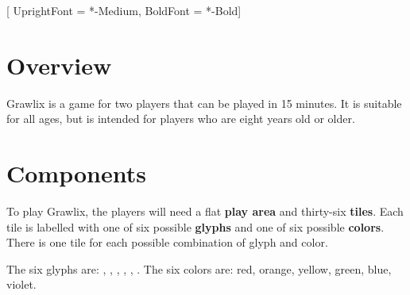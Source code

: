 \setmainfont{Quicksand}[
	UprightFont = *-Medium,
	BoldFont = *-Bold]
\raggedright

\section*{Overview}
Grawlix is a game for two players that can be played in 15  minutes. It is suitable for all ages, but is intended for players who are eight years old or older.



\section*{Components}
To play Grawlix, the players will need a flat \textbf{play area} and thirty-six \textbf{tiles}. Each tile is labelled with one of six possible \textbf{glyphs} and one of six possible \textbf{colors}.  There is one tile for each possible combination of glyph and color.

The six glyphs are: \smallat, \smallpound, \smalldollar, \smallpercent, \smallampersand, \smallasterisk. The six colors are: red, orange, yellow, green, blue, violet.

\bigskip

\begin{figure}[h]
\centering
{}

\end{figure}
